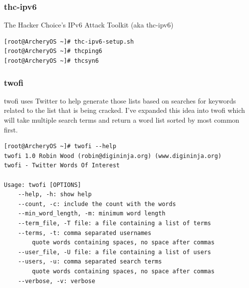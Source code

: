 \documentclass{article}
\begin{document}
\subsubsection{thc-ipv6}
The Hacker Choice's IPv6 Attack Toolkit (aka thc-ipv6)
\begin{lstlisting}
[root@ArcheryOS ~]# thc-ipv6-setup.sh
[root@ArcheryOS ~]# thcping6
[root@ArcheryOS ~]# thcsyn6
\end{lstlisting}

\subsubsection{twofi}
twofi uses Twitter to help generate those lists based on searches for keywords related to the list that is being cracked. I've expanded this idea into twofi which will take multiple search terms and return a word list sorted by most common first. 
\begin{lstlisting}
[root@ArcheryOS ~]# twofi --help
twofi 1.0 Robin Wood (robin@digininja.org) (www.digininja.org)
twofi - Twitter Words Of Interest

Usage: twofi [OPTIONS]
	--help, -h: show help
	--count, -c: include the count with the words
	--min_word_length, -m: minimum word length
	--term_file, -T file: a file containing a list of terms
	--terms, -t: comma separated usernames
		quote words containing spaces, no space after commas
	--user_file, -U file: a file containing a list of users
	--users, -u: comma separated search terms
		quote words containing spaces, no space after commas
	--verbose, -v: verbose
\end{lstlisting}
\end{document}
